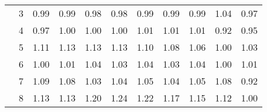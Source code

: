 \begin{tabular}{llrrrrrrrrr}
       & 3 & 0.99 & 0.99 & 0.98 & 0.98 & 0.99 & 0.99 & 0.99 & 1.04 & 0.97 \\
       & 4 & 0.97 & 1.00 & 1.00 & 1.00 & 1.01 & 1.01 & 1.01 & 0.92 & 0.95 \\
       & 5 & 1.11 & 1.13 & 1.13 & 1.13 & 1.10 & 1.08 & 1.06 & 1.00 & 1.03 \\
       & 6 & 1.00 & 1.01 & 1.04 & 1.03 & 1.04 & 1.03 & 1.04 & 1.00 & 1.01 \\
       & 7 & 1.09 & 1.08 & 1.03 & 1.04 & 1.05 & 1.04 & 1.05 & 1.08 & 0.92 \\
       & 8 & 1.13 & 1.13 & 1.20 & 1.24 & 1.22 & 1.17 & 1.15 & 1.12 & 1.00 \\
\bottomrule
\end{tabular}

